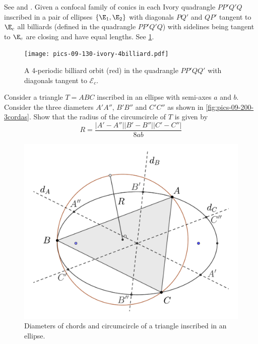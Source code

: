  	
\begin{exercise} See \cite{izmestiev2017-ivory} and \cite{stachel-ivory-2019}.
   Given a confocal family of conics   in each Ivory quadrangle $PP'Q'Q$ inscribed in a pair of ellipses $\{\E_1,\E_2\}$
with diagonals $PQ'$ and $QP'$ tangent to  $\E_c$ all billiards (defined in the quadrangle $PP'Q'Q$) with sidelines
being tangent to $\E_c$ are closing and have equal lengths. See \cref{fig:09-ivory-4billiard}.
\begin{figure}
    \centering
    \texttt{[image: pics-09-130-ivory-4billiard.pdf]}
    \caption{A 4-periodic billiard orbit (red) in the quadrangle $PP'QQ'$ with diagonals tangent to $\mathcal{E}_c$.}
    \label{fig:09-ivory-4billiard}
\end{figure}
\end{exercise}

\begin{exercise}
Consider a triangle $T=ABC$ inscribed in an ellipse with semi-axes $a$ and $b$. Consider the three diameters $A'A''$, $B'B''$ and $C' C''$ as shown in \cref{fig:pics-09-200-3cordas}. Show that the radius of the circumcircle of $T$ is given by
\[R=\frac{ |A'-A''| |B'-B''| |C'-C''| }{8ab}\]

\end{exercise}

\begin{figure}
    \centering
    \includegraphics[scale=0.5]{ii_chap_09/pics/pics-09-200-triangleA_3diametros.pdf}
    \caption{ Diameters of chords and circumcircle of a triangle inscribed in an  ellipse.}
    \label{pics-09-200-3cordas}
\end{figure}

